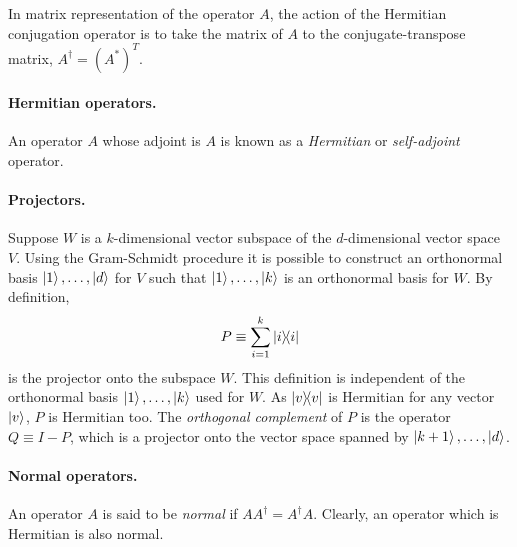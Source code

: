 \documentclass{article}
\numberwithin{theorem}{section}
\numberwithin{corollary}{section}
\numberwithin{postulate}{section}
\begin{document}
In matrix representation of the operator $A$, the action of the Hermitian
conjugation operator is to take the matrix of $A$ to the conjugate-transpose
matrix, $A^{\dagger} = (A^*)^T$.

\paragraph{Hermitian operators.} An operator $A$ whose adjoint is $A$ is known
as a \emph{Hermitian} or \emph{self-adjoint} operator.

\paragraph{Projectors.} Suppose $W$ is a $k$-dimensional vector subspace of the
$d$-dimensional vector space $V$. Using the Gram-Schmidt procedure it is
possible to construct an orthonormal basis $\ket{1}, \ldots, \ket{d}$ for $V$
such that $\ket{1}, \ldots, \ket{k}$ is an orthonormal basis for $W$. By
definition, \[
  P \equiv \sum_{i=1}^k \op{i}{i}
\] is the projector onto the subspace $W$. This definition is independent of
the orthonormal basis $\ket{1}, \ldots, \ket{k}$ used for $W$. As $\op{v}{v}$
is Hermitian for any vector $\ket{v}$, $P$ is Hermitian too. The
\emph{orthogonal complement} of $P$ is the operator $Q \equiv I - P$, which is
a projector onto the vector space spanned by $\ket{k+1}, \ldots, \ket{d}$.

\paragraph{Normal operators.} An operator $A$ is said to be \emph{normal} if
$AA^{\dagger} = A^{\dagger}A$. Clearly, an operator which is Hermitian is also
normal.
\end{document}
